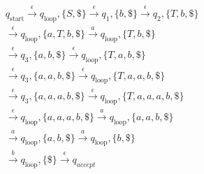 \begin{frame}[allowframebreaks]
\begin{eqnarray*}
&& q_{\text{start}} \stackrel{\epsilon}{\rightarrow}
q_{\text{loop}}, \{S,\$\} 
\stackrel{\epsilon}{\rightarrow} q_1, \{b,\$\}
\stackrel{\epsilon}{\rightarrow} q_2, \{T,b,\$\} \\
&& \stackrel{\epsilon}{\rightarrow} q_{\text{loop}}, \{a,T,b,\$\} 
\stackrel{a}{\rightarrow}
 q_{\text{loop}}, \{T,b,\$\} \\
&& \stackrel{\epsilon}{\rightarrow} q_{3}, \{a, b,\$\} 
\stackrel{\epsilon}{\rightarrow} q_{\text{loop}}, \{T,a,b,\$\}\\
&& \stackrel{\epsilon}{\rightarrow} q_3, \{a,a,b,\$\}
\stackrel{\epsilon}{\rightarrow} q_{\text{loop}}, \{T,a,a,b,\$\}\\
&& \stackrel{\epsilon}{\rightarrow} q_3, \{a,a,a,b,\$\}
\stackrel{\epsilon}{\rightarrow} q_{\text{loop}}, \{T,a,a,a,b,\$\}\\
&& \stackrel{\epsilon}{\rightarrow} q_{\text{loop}}, \{a,a,a,b,\$\}
\stackrel{a}{\rightarrow} q_{\text{loop}}, \{a,a,b,\$\}\\
&& \stackrel{a}{\rightarrow} q_{\text{loop}},\{a,b,\$\}
\stackrel{a}{\rightarrow} q_{\text{loop}}, \{b,\$\}\\
&& \stackrel{b}{\rightarrow} q_{\text{loop}}, \{\$\}
\stackrel{\epsilon}{\rightarrow} q_{accept}
\end{eqnarray*}

\end{frame}


